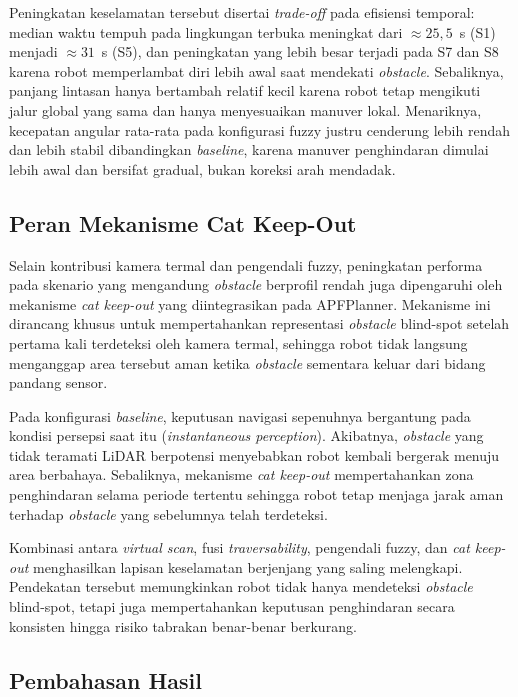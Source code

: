 \documentclass[10pt,twocolumn]{article}
\begin{document}
Peningkatan keselamatan tersebut disertai \textit{trade-off} pada efisiensi temporal: median waktu tempuh pada lingkungan terbuka meningkat dari $\approx25{,}5$~s (S1) menjadi $\approx31$~s (S5), dan peningkatan yang lebih besar terjadi pada S7 dan S8 karena robot memperlambat diri lebih awal saat mendekati \textit{obstacle}. Sebaliknya, panjang lintasan hanya bertambah relatif kecil karena robot tetap mengikuti jalur global yang sama dan hanya menyesuaikan manuver lokal. Menariknya, kecepatan angular rata-rata pada konfigurasi fuzzy justru cenderung lebih rendah dan lebih stabil dibandingkan \textit{baseline}, karena manuver penghindaran dimulai lebih awal dan bersifat gradual, bukan koreksi arah mendadak.

\subsection{Peran Mekanisme Cat Keep-Out}

Selain kontribusi kamera termal dan pengendali fuzzy, peningkatan performa pada skenario yang mengandung \textit{obstacle} berprofil rendah juga dipengaruhi oleh mekanisme \textit{cat keep-out} yang diintegrasikan pada APFPlanner. Mekanisme ini dirancang khusus untuk mempertahankan representasi \textit{obstacle} blind-spot setelah pertama kali terdeteksi oleh kamera termal, sehingga robot tidak langsung menganggap area tersebut aman ketika \textit{obstacle} sementara keluar dari bidang pandang sensor.

Pada konfigurasi \textit{baseline}, keputusan navigasi sepenuhnya bergantung pada kondisi persepsi saat itu (\textit{instantaneous perception}). Akibatnya, \textit{obstacle} yang tidak teramati LiDAR berpotensi menyebabkan robot kembali bergerak menuju area berbahaya. Sebaliknya, mekanisme \textit{cat keep-out} mempertahankan zona penghindaran selama periode tertentu sehingga robot tetap menjaga jarak aman terhadap \textit{obstacle} yang sebelumnya telah terdeteksi.

Kombinasi antara \textit{virtual scan}, fusi \textit{traversability}, pengendali fuzzy, dan \textit{cat keep-out} menghasilkan lapisan keselamatan berjenjang yang saling melengkapi. Pendekatan tersebut memungkinkan robot tidak hanya mendeteksi \textit{obstacle} blind-spot, tetapi juga mempertahankan keputusan penghindaran secara konsisten hingga risiko tabrakan benar-benar berkurang.

\subsection{Pembahasan Hasil}
\end{document}
